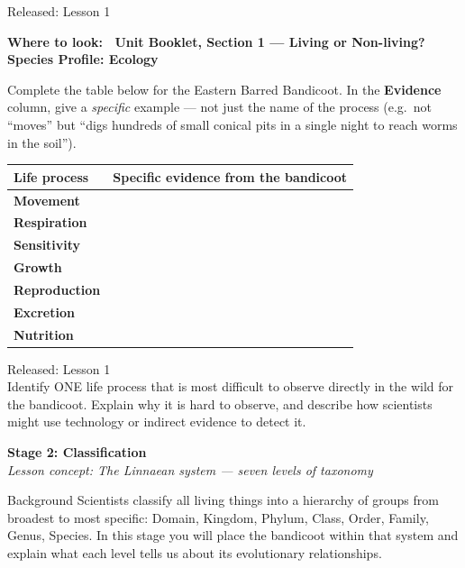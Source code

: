 \documentclass[11pt,a4paper]{article}
\newcommand{\wheretolook}[1]{%
  \par\vspace{2pt}\noindent
  \colorbox{GoldLight}{\parbox{\dimexpr\linewidth-2\fboxsep\relax}{%
    \small\color{GoldDark}\headingfont\bfseries Where to look:\ %
    \normalfont\color{DarkGrey}#1}}\par\vspace{4pt}}
\newcommand{\answerbox}[1]{%
  \begin{tcolorbox}[
    enhanced, breakable, arc=2mm,
    colback=Paper, colframe=Line,
    left=2mm, right=2mm, top=1mm, bottom=1mm,
    boxrule=1pt, height=#1
  ]
  \end{tcolorbox}%
}
\newcommand{\stagediv}[3]{%
  \needspace{6\baselineskip}
  \begin{tcolorbox}[
    enhanced, breakable=false, arc=3.5mm,
    colback=ForestDark, colframe=ForestDark, boxrule=0pt,
    sidebyside, sidebyside align=center,
    lefthand width=2.2cm,
    left=2mm, right=4mm, top=4mm, bottom=4mm
  ]
    \begin{center}
      {\headingfont\bfseries\color{Forest!35!ForestDark}\fontsize{42}{42}\selectfont #1}
    \end{center}
    \tcblower
    {\headingfont\bfseries\color{white}\large Stage #1: #2}\\[3pt]
    {\itshape\color{white!75!ForestDark}\small Lesson concept: #3}
  \end{tcolorbox}%
  \vspace{6pt}%
}
\newcommand{\yr}[2]{\noindent{\headingfont\bfseries\small\color{Forest}%
  \rule[0.2ex]{1.2em}{2pt}\hspace{4pt}#1}\hfill{\small\color{DarkGrey}#2}\\[2pt]}
\newcommand{\yrviii}[2]{\noindent{\headingfont\bfseries\small\color{Violet}%
  \rule[0.2ex]{1.2em}{2pt}\hspace{4pt}#1}\hfill{\small\color{DarkGrey}#2}\\[2pt]}
\begin{document}
\begin{yr7box}
\yr{At The Level}{Released: Lesson 1}

\wheretolook{Unit Booklet, Section 1 --- Living or Non-living? \textbullet{} \textbf{Species Profile: Ecology}}
Complete the table below for the Eastern Barred Bandicoot. In the \textbf{Evidence} column, give a \emph{specific} example --- not just the name of the process (e.g.\ not ``moves'' but ``digs hundreds of small conical pits in a single night to reach worms in the soil'').

\medskip
\noindent\begin{tabularx}{\linewidth}{|>{\bfseries}p{3.2cm}|X|}
  \hline
  \rowcolor{TableHead}
  \headingfont\bfseries\color{white} Life process & \headingfont\bfseries\color{white} Specific evidence from the bandicoot \\
  \hline
  Movement &  \\[30pt]
  \hline
  \rowcolor{RowAlt}
  Respiration &  \\[30pt]
  \hline
  Sensitivity &  \\[30pt]
  \hline
  \rowcolor{RowAlt}
  Growth &  \\[30pt]
  \hline
  Reproduction &  \\[30pt]
  \hline
  \rowcolor{RowAlt}
  Excretion &  \\[30pt]
  \hline
  Nutrition &  \\[30pt]
  \hline
\end{tabularx}
\end{yr7box}

\bigskip
\newpage
\begin{yr8box}
\yrviii{Above The Level}{Released: Lesson 1}
Identify ONE life process that is most difficult to observe directly in the wild for the bandicoot. Explain why it is hard to observe, and describe how scientists might use technology or indirect evidence to detect it.
\answerbox{16cm}
\end{yr8box}

\newpage

\stagediv{2}{Classification}{The Linnaean system — seven levels of taxonomy}

\begin{contextbox}{Background}
Scientists classify all living things into a hierarchy of groups from broadest to most specific: Domain, Kingdom, Phylum, Class, Order, Family, Genus, Species. In this stage you will place the bandicoot within that system and explain what each level tells us about its evolutionary relationships.
\end{contextbox}
\end{document}
